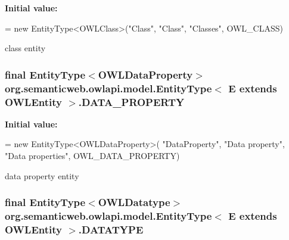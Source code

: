 {\bfseries Initial value\-:}
\begin{DoxyCode}
= \textcolor{keyword}{new} EntityType<OWLClass>(\textcolor{stringliteral}{"Class"},
            \textcolor{stringliteral}{"Class"}, \textcolor{stringliteral}{"Classes"}, OWL\_CLASS)
\end{DoxyCode}
class entity \hypertarget{classorg_1_1semanticweb_1_1owlapi_1_1model_1_1_entity_type_3_01_e_01extends_01_o_w_l_entity_01_4_a04d10ad4ae1fc502c27a0b332dc23c27}{
\subsubsection[{D\-A\-T\-A\-\_\-\-P\-R\-O\-P\-E\-R\-T\-Y}]{\setlength{\rightskip}{0pt plus 5cm}final {\bf Entity\-Type}$<${\bf O\-W\-L\-Data\-Property}$>$ org.\-semanticweb.\-owlapi.\-model.\-Entity\-Type$<$ E extends {\bf O\-W\-L\-Entity} $>$.D\-A\-T\-A\-\_\-\-P\-R\-O\-P\-E\-R\-T\-Y\hspace{0.3cm}{\ttfamily [static]}}}\label{classorg_1_1semanticweb_1_1owlapi_1_1model_1_1_entity_type_3_01_e_01extends_01_o_w_l_entity_01_4_a04d10ad4ae1fc502c27a0b332dc23c27}
{\bfseries Initial value\-:}
\begin{DoxyCode}
= \textcolor{keyword}{new} EntityType<OWLDataProperty>(
            \textcolor{stringliteral}{"DataProperty"}, \textcolor{stringliteral}{"Data property"}, \textcolor{stringliteral}{"Data properties"}, OWL\_DATA\_PROPERTY)
\end{DoxyCode}
data property entity \hypertarget{classorg_1_1semanticweb_1_1owlapi_1_1model_1_1_entity_type_3_01_e_01extends_01_o_w_l_entity_01_4_a13b2fbb5eb3360ceddab6cab43698d98}{
\subsubsection[{D\-A\-T\-A\-T\-Y\-P\-E}]{\setlength{\rightskip}{0pt plus 5cm}final {\bf Entity\-Type}$<${\bf O\-W\-L\-Datatype}$>$ org.\-semanticweb.\-owlapi.\-model.\-Entity\-Type$<$ E extends {\bf O\-W\-L\-Entity} $>$.D\-A\-T\-A\-T\-Y\-P\-E\hspace{0.3cm}{\ttfamily [static]}}}\label{classorg_1_1semanticweb_1_1owlapi_1_1model_1_1_entity_type_3_01_e_01extends_01_o_w_l_entity_01_4_a13b2fbb5eb3360ceddab6cab43698d98}

